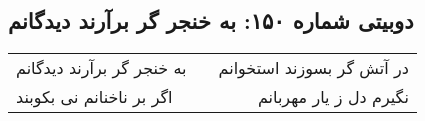 \begin{center}
\section*{دوبیتی شماره ۱۵۰: به خنجر گر برآرند دیدگانم}
\label{sec:150}
\begin{longtable}{l p{0.5cm} r}
به خنجر گر برآرند دیدگانم
&&
در آتش گر بسوزند استخوانم
\\
اگر بر ناخنانم نی بکوبند
&&
نگیرم دل ز یار مهربانم
\\
\end{longtable}
\end{center}
